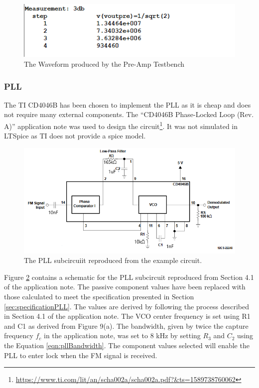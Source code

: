 \begin{figure}[H]
    \centering 
    \includegraphics[width=\textwidth]{../Circuits/Images/Pre-Amp/TestBenchOutput}
    \caption{The Waveform produced by the Pre-Amp Testbench}
    \label{fig:preAmpTestBenchOutput}
\end{figure}

\subsubsection{PLL}
The TI CD4046B has been chosen to implement the PLL as it is cheap and does not require many external components. 
The ``CD4046B Phase-Locked Loop (Rev. A)'' application note was used to design the circuit\footnote{\url{https://www.ti.com/lit/an/scha002a/scha002a.pdf?&ts=1589738760062}}. 
It was not simulated in LTSpice as TI does not provide a spice model.

\begin{figure}[H]
    \centering 
    \includegraphics[width=\textwidth]{../Circuits/Images/PLL/PLLReproduction}
    \caption{The PLL subcircuiit reproduced from the example circuit.}
    \label{fig:PLLSubcircuit}
\end{figure}

Figure \ref{fig:PLLSubcircuit} contains a schematic for the PLL subcircuit reproduced from Section 4.1 of the application note. 
The passive component values have been replaced with those calculated to meet the specification presented in Section \ref{sec:specificationPLL}. 
The values are derived by following the process described in Section 4.1 of the application note. 
The VCO center frequency is set using R1 and C1 as derived from Figure 9(a).
The bandwidth, given by twice the capture frequency $f_{c}$ in the application note, was set to 8 kHz by setting $R_{3}$ and $C_{2}$ using the Equation \ref{eqn:pllBandwidth}.
The component values selected will enable the PLL to enter lock when the FM signal is received.


